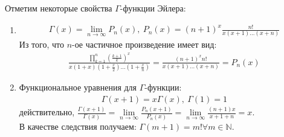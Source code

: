 Отметим некоторые свойства $\Gamma$-функции Эйлера:
\begin{enumerate}
  \item
    \begin{gather}
      \Gamma(x) = \lim\limits_{n \to \infty} P_n(x), \ P_n(x) = (n+1)^x
      \frac{n!}{x(x+1)\dots(x+n)}
      \label{ch92:eq2}
    \end{gather}
    Из того, что $n$-ое частичное произведение имеет вид:
    \begin{gather*}
      \frac{\prod\limits_{k = 1}^n \left(\frac{k + 1}{k}\right)^x}{x(1 + x)(1 +
      \frac{x}{2})\dots(1+\frac{x}{n})} = \frac{(n + 1)^x n!}{x(x + 1) \dots (x
      +n)} = P_n(x)
    \end{gather*}
  \item Функциональное уравнения для $\Gamma$-функции:
    \begin{gather}
      \Gamma(x + 1) = x \Gamma(x), \ \Gamma(1) = 1
      \label{ch92:eq3}
    \end{gather}
    действительно, $\frac{\Gamma(x + 1)}{\Gamma(x)} = \lim\limits_{n \to
    \infty} \frac{P_n(x + 1)}{P_n(x)} = \lim\limits_{n \to \infty} \frac{(n +
    1)x}{x + 1 + n} = x$. \\
    В качестве следствия получаем: $\Gamma(m + 1) = m! \forall m \in \mathbb{N}$.
\end{enumerate}

